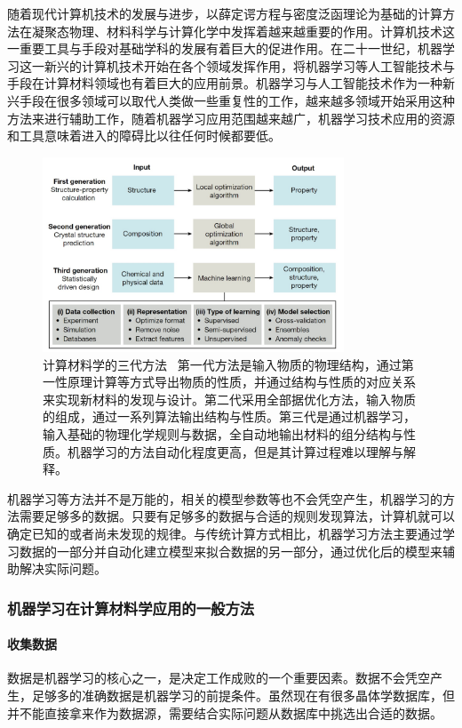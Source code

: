 随着现代计算机技术的发展与进步，以薛定谔方程与密度泛函理论为基础的计算方法在凝聚态物理、材料科学与计算化学中发挥着越来越重要的作用。计算机技术这一重要工具与手段对基础学科的发展有着巨大的促进作用。在二十一世纪，机器学习这一新兴的计算机技术开始在各个领域发挥作用，将机器学习等人工智能技术与手段在计算材料领域也有着巨大的应用前景。机器学习与人工智能技术作为一种新兴手段在很多领域可以取代人类做一些重复性的工作，越来越多领域开始采用这种方法来进行辅助工作，随着机器学习应用范围越来越广，机器学习技术应用的资源和工具意味着进入的障碍比以往任何时候都要低。

\begin{figure}[h]
    \centering
\includegraphics[width=0.8\textwidth]{./pic/025.png}
\caption{计算材料学的三代方法 \ 第一代方法是输入物质的物理结构，通过第一性原理计算等方式导出物质的性质，并通过结构与性质的对应关系来实现新材料的发现与设计。第二代采用全部据优化方法，输入物质的组成，通过一系列算法输出结构与性质。第三代是通过机器学习，输入基础的物理化学规则与数据，全自动地输出材料的组分结构与性质。机器学习的方法自动化程度更高，但是其计算过程难以理解与解释。}

\label{dog025}
\end{figure}

机器学习等方法并不是万能的，相关的模型参数等也不会凭空产生，机器学习的方法需要足够多的数据。只要有足够多的数据与合适的规则发现算法，计算机就可以确定已知的或者尚未发现的规律。与传统计算方式相比，机器学习方法主要通过学习数据的一部分并自动化建立模型来拟合数据的另一部分，通过优化后的模型来辅助解决实际问题。

\subsubsection{机器学习在计算材料学应用的一般方法}

\paragraph{收集数据}
数据是机器学习的核心之一，是决定工作成败的一个重要因素。数据不会凭空产生，足够多的准确数据是机器学习的前提条件。虽然现在有很多晶体学数据库，但并不能直接拿来作为数据源，需要结合实际问题从数据库中挑选出合适的数据。

